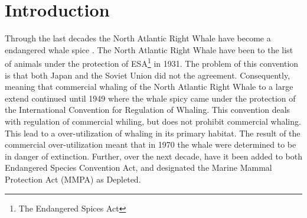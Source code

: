 \section{Introduction}
Through the last decades the North Atlantic Right Whale have become a endangered whale spice \cite{NOAA}. 
The North Atlantic Right Whale have been to the list of animals under the protection of ESA\footnote{The Endangered Spices Act} in 1931. 
The problem of this convention is that both Japan and the Soviet Union did not the agreement. 
Consequently, meaning that commercial whaling of the North Atlantic Right Whale to a large extend continued until 1949 where the whale spicy came under the protection of the International Convention for Regulation of Whaling. 
This convention deals with regulation of commercial whiling, but does not prohibit commercial whaling. 
This lead to a over-utilization of whaling in its primary habitat. The result of the commercial over-utilization meant that in 1970 the whale were determined to be in danger of extinction. 
Further, over the next decade, have it been added to both Endangered Species Convention Act, and designated the Marine Mammal Protection Act (MMPA) as Depleted.

